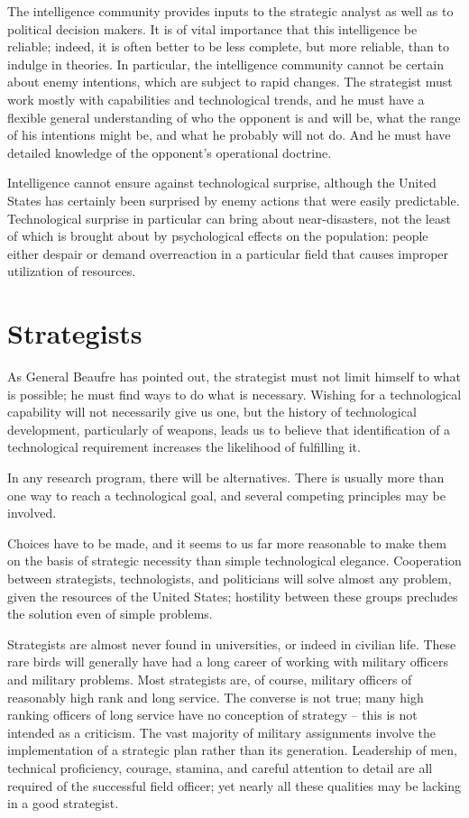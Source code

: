 The intelligence community provides inputs to the strategic analyst as well as to political decision makers. It is of vital importance that this intelligence be reliable; indeed, it is often better to be less complete, but more reliable, than to indulge in theories. In particular, the intelligence community cannot be certain about enemy intentions, which are subject to rapid changes. The strategist must work mostly with capabilities and technological trends, and he must have a flexible general understanding of who the opponent is and will be, what the range of his intentions might be, and what he probably will not do. And he must have detailed knowledge of the opponent's operational doctrine.

Intelligence cannot ensure against technological surprise, although the United States has certainly been surprised by enemy actions that were easily predictable. Technological surprise in particular can bring about near-disasters, not the least of which is brought about by psychological effects on the population: people either despair or demand overreaction in a particular field that causes improper utilization of resources.

\section{Strategists}
As General Beaufre has pointed out, the strategist must not limit himself to what is possible; he must find ways to do what is necessary. Wishing for a technological capability will not necessarily give us one, but the history of technological development, particularly of weapons, leads us to believe that identification of a technological requirement increases the likelihood of fulfilling it.

In any research program, there will be alternatives. There is usually more than one way to reach a technological goal, and several competing principles may be involved.

Choices have to be made, and it seems to us far more reasonable to make them on the basis of strategic necessity than simple technological elegance. Cooperation between strategists, technologists, and politicians will solve almost any problem, given the resources of the United States; hostility between these groups precludes the solution even of simple problems.

Strategists are almost never found in universities, or indeed in civilian life. These rare birds will generally have had a long career of working with military officers and military problems. Most strategists are, of course, military officers of reasonably high rank and long service. The converse is not true; many high ranking officers of long service have no conception of strategy -- this is not intended as a criticism. The vast majority of military assignments involve the implementation of a strategic plan rather than its generation. Leadership of men, technical proficiency, courage, stamina, and careful attention to detail are all required of the successful field officer; yet nearly all these qualities may be lacking in a good strategist.

